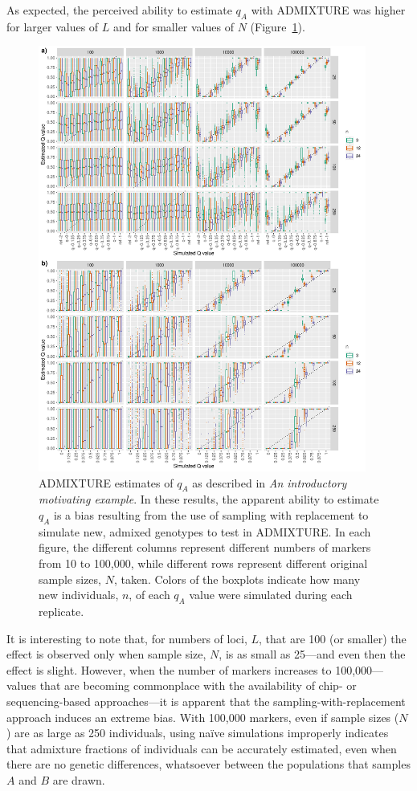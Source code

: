 As expected, the perceived ability to estimate $q_A$ with ADMIXTURE was higher
for larger values of $L$ and for smaller values of $N$ (Figure~\ref{fig:bias-sims}).
\begin{figure}
\newcommand{\biassimscap}{\footnotesize ADMIXTURE estimates of $q_A$ as described in
{\em An introductory motivating example}. In these results, the apparent ability to estimate $q_A$
is a bias resulting from the use of sampling with replacement to simulate new, admixed genotypes to
test in ADMIXTURE.  In each figure, the different columns represent different numbers of markers
from 10 to 100,000, while different rows represent different original sample sizes, $N$, taken. Colors
of the boxplots indicate how many new individuals, $n$, of each $q_A$ value were simulated during each
replicate.}
\includegraphics[width=0.96\textwidth]{figures/bias-sims-unsup-and-sup.pdf}
\caption[\biassimscap]{\biassimscap}
\label{fig:bias-sims}
\end{figure}
It is interesting to note
that, for numbers of loci,  $L$, that are 100 (or smaller) the effect is observed only when
sample size, $N$, is as small as 25---and even then the effect is slight.  However, when the
number of markers increases to 100,000---values that are becoming commonplace with the availability of chip-
or sequencing-based approaches---it is apparent that the sampling-with-replacement approach
induces an extreme bias.  With 100,000 markers, even if sample sizes ($N$) are as large as 250 individuals,
using na\"{i}ve simulations improperly indicates that admixture fractions of individuals can be
accurately estimated, even when there are no genetic differences, whatsoever between the populations that
samples $A$ and $B$ are drawn.



